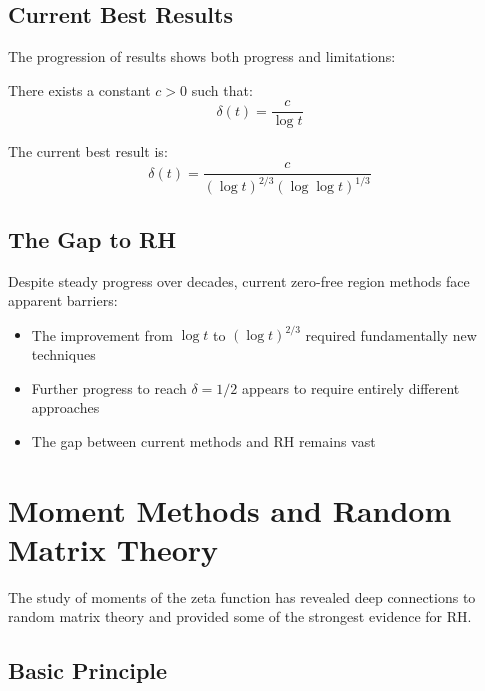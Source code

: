 \subsection{Current Best Results}

The progression of results shows both progress and limitations:

\begin{theorem}
There exists a constant $c > 0$ such that:
\begin{equation}
\delta(t) = \frac{c}{\log t}
\end{equation}
\end{theorem}

\begin{theorem}
The current best result is:
\begin{equation}
\delta(t) = \frac{c}{(\log t)^{2/3}(\log \log t)^{1/3}}
\end{equation}
\end{theorem}

\subsection{The Gap to RH}

\begin{remark}
Despite steady progress over decades, current zero-free region methods face apparent barriers:
\begin{itemize}
\item The improvement from $\log t$ to $(\log t)^{2/3}$ required fundamentally new techniques
\item Further progress to reach $\delta = 1/2$ appears to require entirely different approaches
\item The gap between current methods and RH remains vast
\end{itemize}
\end{remark}

\section{Moment Methods and Random Matrix Theory}

The study of moments of the zeta function has revealed deep connections to random matrix theory and provided some of the strongest evidence for RH.

\subsection{Basic Principle}

